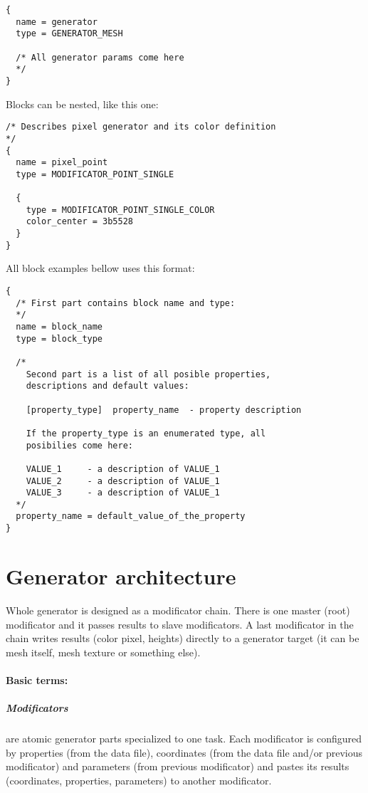 \documentclass[9pt]{article}
\begin{document}
\begin{verbatim}
{
  name = generator
  type = GENERATOR_MESH

  /* All generator params come here
  */
}
\end{verbatim}

Blocks can be nested, like this one:

\begin{verbatim}
/* Describes pixel generator and its color definition
*/
{
  name = pixel_point
  type = MODIFICATOR_POINT_SINGLE

  {
    type = MODIFICATOR_POINT_SINGLE_COLOR
    color_center = 3b5528
  }
}
\end{verbatim}

All block examples bellow uses this format:

\begin{verbatim}
{
  /* First part contains block name and type:
  */
  name = block_name
  type = block_type

  /*
    Second part is a list of all posible properties,
    descriptions and default values:

    [property_type]  property_name  - property description
   
    If the property_type is an enumerated type, all 
    posibilies come here:
    
    VALUE_1     - a description of VALUE_1
    VALUE_2     - a description of VALUE_1
    VALUE_3     - a description of VALUE_1
  */  
  property_name = default_value_of_the_property  
}
\end{verbatim}

\section{Generator architecture}

Whole generator is designed as a modificator chain. There is one master (root)
modificator and it passes results to slave modificators. A last modificator 
in the chain writes results (color pixel, heights) directly to a generator target
(it can be mesh itself, mesh texture or something else).

\paragraph{Basic terms:}
\subparagraph{Modificators}
are atomic generator parts specialized to one task. Each modificator 
is configured by properties (from the data file), coordinates (from the data 
file and/or previous modificator) and parameters (from previous modificator) and
pastes its results (coordinates, properties, parameters) to another modificator. 
\end{document}
